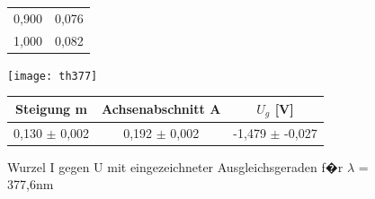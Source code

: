 \documentclass[a4paper, 10pt]{report}%
\begin{document}
\begin{figure}[!htbp]
\begin{minipage}[t]{2cm}
\begin{center}
\begin{tabular}{c|c}
0,900&	0,076\\
1,000&	0,082\end{tabular}
\end{center}
\end{minipage}
\hfill
\begin{minipage}[t]{12cm}
\vspace{0pt}
\texttt{[image: th377]}
\caption{Wurzel I gegen U mit eingezeichneter Ausgleichsgeraden f�r $\lambda$ = 377,6nm}
\begin{center}
\begin{tabular}{c|c|c}
Steigung m & Achsenabschnitt A & $U_g$ [V]\\
\hline
0,130 $\pm$ 0,002 & 0,192 $\pm$	0,002 & -1,479 $\pm$	-0,027
\end{tabular}
\end{center}
\end{minipage}
\end{figure}


\newpage
\end{document}
